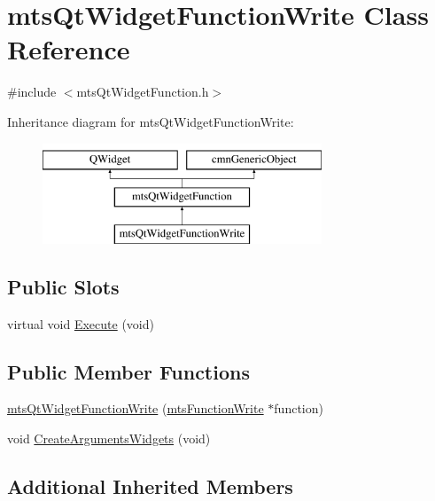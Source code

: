 \hypertarget{classmts_qt_widget_function_write}{}\section{mts\+Qt\+Widget\+Function\+Write Class Reference}
\label{classmts_qt_widget_function_write}


{\ttfamily \#include $<$mts\+Qt\+Widget\+Function.\+h$>$}

Inheritance diagram for mts\+Qt\+Widget\+Function\+Write\+:\begin{figure}[H]
\begin{center}
\leavevmode
\includegraphics[height=3.000000cm]{d0/d67/classmts_qt_widget_function_write}
\end{center}
\end{figure}
\subsection*{Public Slots}
\begin{DoxyCompactItemize}
\item 
virtual void \hyperlink{classmts_qt_widget_function_write_a1991ced763293df591315da0b3f43c59}{Execute} (void)
\end{DoxyCompactItemize}
\subsection*{Public Member Functions}
\begin{DoxyCompactItemize}
\item 
\hyperlink{classmts_qt_widget_function_write_a9f931456c21e0e55a0f169bf51600fa5}{mts\+Qt\+Widget\+Function\+Write} (\hyperlink{classmts_function_write}{mts\+Function\+Write} $\ast$function)
\item 
void \hyperlink{classmts_qt_widget_function_write_af29a8e53ccc8db0705d4e2f68198ff59}{Create\+Arguments\+Widgets} (void)
\end{DoxyCompactItemize}
\subsection*{Additional Inherited Members}


